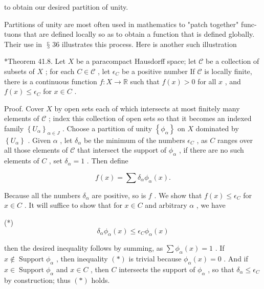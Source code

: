 \documentclass[10pt]{article}
\begin{document}
to obtain our desired partition of unity.

Partitions of unity are most often used in mathematics to "patch together" func-tuons that are defined locally so as to obtain a function that is defined globally. Their use in \(\text{ § }{36}\) illustrates this process. Here is another such illustration

*Theorem 41.8. Let \(X\) be a paracompact Hausdorff space; let \(\mathcal{C}\) be a collection of subsets of \(X\) ; for each \(C \in  \mathcal{C}\) , let \({\epsilon }_{C}\) be a positive number If \(\mathcal{C}\) is locally finite, there is a continuous function \(f : X \rightarrow  \mathbb{R}\) such that \(f\left( x\right)  > 0\) for all \(x\) , and \(f\left( x\right)  \leq  {\epsilon }_{C}\) for \(x \in  C\) .

Proof. Cover \(X\) by open sets each of which intersects at most finitely many elements of \(\mathcal{C}\) ; index this collection of open sets so that it becomes an indexed family \({\left\{  {U}_{\alpha }\right\}  }_{\alpha  \in  J}\) . Choose a partition of unity \(\left\{  {\phi }_{\alpha }\right\}\) on \(X\) dominated by \(\left\{  {U}_{\alpha }\right\}\) . Given \(\alpha\) , let \({\delta }_{\alpha }\) be the minimum of the numbers \({\epsilon }_{C}\) , as \(C\) ranges over all those elements of \(\mathcal{C}\) that intersect the support of \({\phi }_{\alpha }\) , if there are no such elements of \(C\) , set \({\delta }_{\alpha } = 1\) . Then define

\[
f\left( x\right)  = \sum {\delta }_{\alpha }{\phi }_{\alpha }\left( x\right) .
\]

Because all the numbers \({\delta }_{\alpha }\) are positive, so is \(f\) . We show that \(f\left( x\right)  \leq  {\epsilon }_{C}\) for \(x \in  C\) . It will suffice to show that for \(x \in  C\) and arbitrary \(\alpha\) , we have

(*)
\[
{\delta }_{\alpha }{\phi }_{\alpha }\left( x\right)  \leq  {\epsilon }_{C}{\phi }_{\alpha }\left( x\right)
\]

then the desired inequality follows by summing, as \(\sum {\phi }_{\alpha }\left( x\right)  = 1\) . If \(x \notin  \operatorname{Support}{\phi }_{\alpha }\) , then inequality \(\left( *\right)\) is trivial because \({\phi }_{\alpha }\left( x\right)  = 0\) . And if \(x \in  \operatorname{Support}{\phi }_{\alpha }\) and \(x \in  C\) , then \(C\) intersects the support of \({\phi }_{\alpha }\) , so that \({\delta }_{\alpha } \leq  {\epsilon }_{C}\) by construction; thus \(\left( *\right)\) holds.
\end{document}
